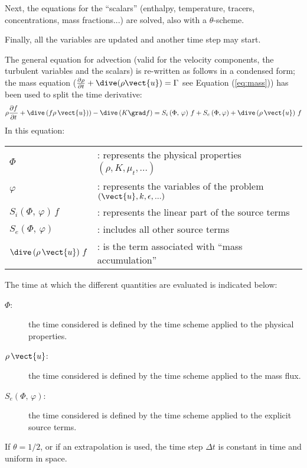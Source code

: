 Next, the equations for the ``scalars'' (enthalpy, temperature, tracers,
concentrations, mass fractions...) are solved, also with a $\theta$-scheme.

Finally, all the variables are updated and another time step may start.

The general equation for advection (valid for the velocity components, the
turbulent variables and the scalars) is re-written as follows in a condensed
form; the mass equation ($\frac{\partial \rho } {\partial t}+ \dive(\rho
\vect{u}) = \Gamma$ see Equation (\ref{eq:mass})) has been used to split the time derivative:
%
\begin{equation}\label{eq:transport_eq_scalar}%
\rho \frac {\partial f}{\partial t} + \dive  \left(f \rho\,\vect{u}) \right) - %
\dive \left(K \grad f \right) = S_{i}\left(\Phi, \, \varphi\right)\,f + S_{e}\left(\Phi,\varphi \right) 
+ \dive  \left(\rho\,\vect{u} \right)\,f
\end{equation}
In this equation:

\begin{tabular}{ll}
$\Phi$ & : represents the physical properties $(\rho,K,\mu_{t},...)$ \\
$\varphi$ & : represents the variables of the problem $(\vect{u}%
,k,\epsilon,...)$ \\
$S_{i}\left(\Phi, \, \varphi \right)\,f$ & : represents the linear part of the source terms
\\
$S_{e} \left(\Phi, \, \varphi \right)$ & : includes all other source terms \\
$\dive \left(\rho\,\vect{u}\right)\,f$ & : is the term associated with ``mass
accumulation''%
\end{tabular}

The time at which the different quantities are evaluated is indicated below:
%
\begin{description}
\item[$\Phi$:] the time considered is defined by the time scheme applied
to the physical properties.
\item[$\rho\,\vect{u}$:] the time considered is defined by the
time scheme applied to the mass flux.
\item[$S_{e}\left(\Phi, \, \varphi \right)$:] the time considered is defined by the time
scheme applied to the explicit source terms.
\end{description}

If $\theta=1/2$, or if an extrapolation is used, the time step $\Delta t$ is
constant in time and uniform in space.

